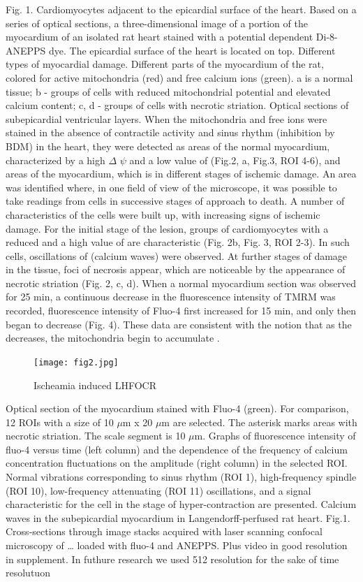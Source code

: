 \documentclass{biophys-new}
\begin{document}
Fig. 1. Cardiomyocytes adjacent to the epicardial surface of the heart.
Based on a series of optical sections, a three-dimensional image of a portion of the myocardium of an isolated rat heart stained with a potential dependent Di-8-ANEPPS dye.
The epicardial surface of the heart is located on top.
Different types of myocardial damage.
Different parts of the myocardium of the rat, colored for active mitochondria (red) and free calcium ions (green). a is a normal tissue; b - groups of cells with reduced mitochondrial potential and elevated calcium content; c, d - groups of cells with necrotic striation. Optical sections of subepicardial ventricular layers.
When the mitochondria and free  ions were stained in the absence of contractile activity and sinus rhythm (inhibition by BDM) in the heart, they were detected as areas of the normal myocardium, characterized by a high $\Delta$ $\psi$ and a low value of  (Fig.2, a, Fig.3, ROI 4-6), and areas of the myocardium, which is in different stages of ischemic damage.
An area was identified where, in one field of view of the microscope, it was possible to take readings from cells in successive stages of approach to death. A number of characteristics of the cells were built up, with increasing signs of ischemic damage.
For the initial stage of the lesion, groups of cardiomyocytes with a reduced and a high value of  are characteristic (Fig. 2b, Fig. 3, ROI 2-3). In such cells, oscillations of  (calcium waves) were observed. At further stages of damage in the tissue, foci of necrosis appear, which are noticeable by the appearance of necrotic striation (Fig. 2, c, d). When a normal myocardium section was observed for 25 min, a continuous decrease in the fluorescence intensity of TMRM was recorded, fluorescence intensity of Fluo-4 first increased for 15 min, and only then began to decrease (Fig. 4). These data are consistent with the notion that as the decreases, the mitochondria begin to accumulate .

\begin{figure}
    \texttt{[image: fig2.jpg]}
    \caption{Ischeamia induced LHFOCR}
    \label{fig:fig2}
\end{figure}


Optical section of the myocardium stained with Fluo-4 (green).
For comparison, 12 ROIs with a size of 10 $\mu$m x 20 $\mu$m are selected.
The asterisk marks areas with necrotic striation. The scale segment is 10 $\mu$m.
Graphs of fluorescence intensity of fluo-4 versus time (left column) and the dependence of the frequency of calcium concentration fluctuations on the amplitude (right column) in the selected ROI.
Normal vibrations corresponding to sinus rhythm (ROI 1), high-frequency spindle (ROI 10), low-frequency attenuating (ROI 11) oscillations, and a signal characteristic for the cell in the stage of hyper-contraction are presented.
Calcium waves in the subepicardial myocardium in Langendorff-perfused rat heart. Fig.1. Cross-sections through image stacks acquired with laser scanning confocal microscopy of … loaded with fluo-4 and ANEPPS.
Plus video in good resolution in supplement. In futhure research we used 512 resolution for the sake of time resolutuon
\end{document}
